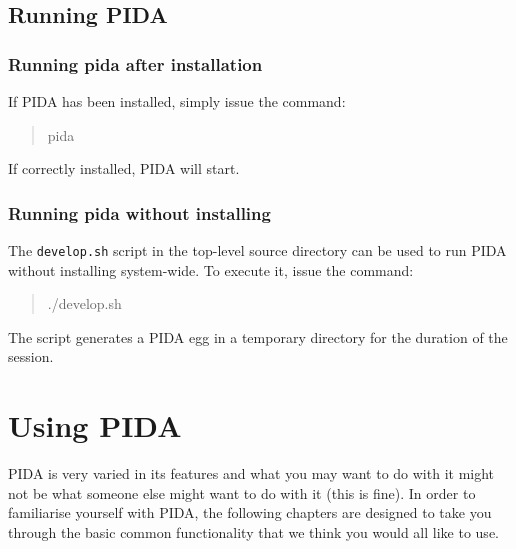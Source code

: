 \documentclass[10pt,a4paper,english]{article}
\begin{document}
\hypertarget{running-pida}{}
\subsection*{Running PIDA}



\hypertarget{running-pida-after-installation}{}
\subsubsection*{Running pida after installation}

If PIDA has been installed, simply issue the command:
\begin{quote}{\ttfamily \raggedright \noindent
pida
}\end{quote}

If correctly installed, PIDA will start.



\hypertarget{running-pida-without-installing}{}
\subsubsection*{Running pida without installing}

The \texttt{develop.sh} script in the top-level source directory can be used to run
PIDA without installing system-wide. To execute it, issue the command:
\begin{quote}{\ttfamily \raggedright \noindent
./develop.sh
}\end{quote}

The script generates a PIDA egg in a temporary directory for the duration of
the session.



\hypertarget{using-pida}{}
\section*{Using PIDA}

PIDA is very varied in its features and what you may want to do with it might
not be what someone else might want to do with it (this is fine). In order to
familiarise yourself with PIDA, the following chapters are designed to take
you through the basic common functionality that we think you would all like to
use.
\end{document}
